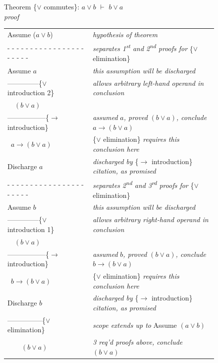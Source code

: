 {\begin{figure}
Theorem \{$\vee$ commutes\}: $a \vee b$ $\vdash$ $b \vee a$ \\
\emph{proof}
\begin{center}
\begin{spacing}{0.9}
\begin{tabular}{ll}
Assume ($a \vee b$)          &\emph{hypothesis of theorem}\\
 - - - - - - - - - - - - - - - - - - - - - -&\emph{separates 1\textsuperscript{st} and 2\textsuperscript{nd} proofs for} \{$\vee$ elimination\} \\
Assume $a$          &\emph{this assumption will be discharged}\\
--------------\{$\vee$ introduction 2\} &\emph{allows arbitrary left-hand operand in conclusion}\\
~~$(b \vee a)$        &\\
-----------------\{$\rightarrow$ introduction\} &\emph{assumed} $a$\emph{, proved} $(b \vee a)$\emph{, conclude} $a \rightarrow (b \vee a)$ \\
~$a \rightarrow (b \vee a)$ &\{$\vee$ elimination\} \emph{requires this conclusion here}\\
Discharge $a$              &\emph{discharged by} \{$\rightarrow$ introduction\} \emph{citation, as promised}\\
 - - - - - - - - - - - - - - - - - - - - - -&\emph{separates 2\textsuperscript{nd} and 3\textsuperscript{rd} proofs for} \{$\vee$ elimination\}\\
Assume $b$          &\emph{this assumption will be discharged}\\
--------------\{$\vee$ introduction 1\} &\emph{allows arbitrary right-hand operand in conclusion}\\
~~$(b \vee a)$        &\\
-----------------\{$\rightarrow$ introduction\} &\emph{assumed} $b$\emph{, proved} $(b \vee a)$\emph{, conclude} $b \rightarrow (b \vee a)$\\
~$b \rightarrow (b \vee a)$ &\{$\vee$ elimination\} \emph{requires this conclusion here}\\
Discharge $b$               &\emph{discharged by} \{$\rightarrow$ introduction\} \emph{citation, as promised}\\
---------------\{$\vee$ elimination\}       &\emph{scope extends up to} Assume $(a \vee b)$\\
~~~~$(b \vee a)$        &\emph{3 req'd proofs above, conclude} $(b \vee a)$\\

\end{tabular}
\end{spacing}
\end{center}
\end{figure}}
